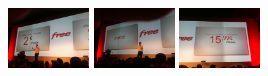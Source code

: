 \documentclass{acm_proc_article-sp}
\newcommand{\thumbheight}{16mm}
\newenvironment{thumbsequence}{}{\makebox[4mm]{}}
\begin{document}
\begin{figure}
\begin{centering}
\begin{thumbsequence}
	\end{thumbsequence}
	\begin{thumbsequence}
		\includegraphics[height=\thumbheight]{resources/free/looseduplicate9.jpg}
		\includegraphics[height=\thumbheight]{resources/free/looseduplicate10.jpg}
		\includegraphics[height=\thumbheight]{resources/free/looseduplicate11.jpg}

\end{thumbsequence}
\end{centering}
\end{figure}
\end{document}
